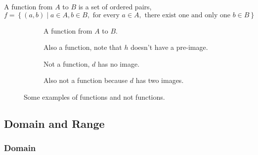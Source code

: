 

\begin{definition}
    \label{def: function}
    A function from \(A\) to \(B\) is a set of ordered pairs, \[
        f = \left\{(a,b) \mid a \in A, b \in B, \text{ for every } a \in A, \text{ there
        exist one and only one } b \in B \right\}
    \]
\end{definition}



\begin{figure}[H]
    \begin{subfigure}{.5\textwidth}
        \centering
        \caption{A function from \(A\) to \(B\).}
    \end{subfigure}%
    \begin{subfigure}{.5\textwidth}
        \centering
        \caption{Also a function, note that \(h\) doesn't have a pre-image.}
    \end{subfigure}
    \begin{subfigure}{.5\textwidth}
        \centering
        \caption{Not a function, \(d\) has no image.}
    \end{subfigure}
    \begin{subfigure}{.5\textwidth}
        \centering
        \caption{Also not a function because \(d\) has two images.}
    \end{subfigure}
    \caption{Some examples of functions and not functions.}
\end{figure}

\subsection{Domain and Range}

\subsubsection{Domain}

